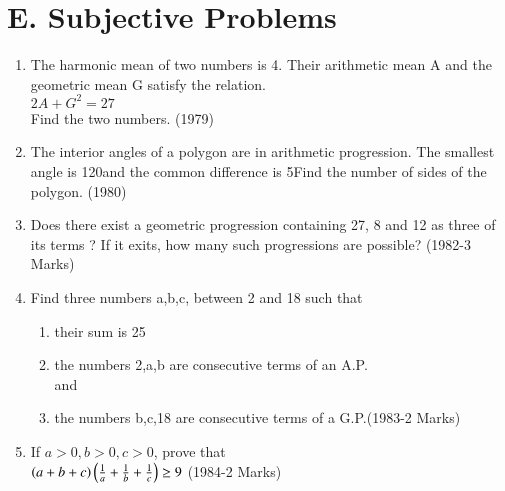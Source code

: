 \documentclass[journal,12pt,twocolumn]{IEEEtran}
\theoremstyle{remark}
\begin{document}
\section*{E. Subjective Problems}
\begin{enumerate}
    \item The harmonic mean of two numbers is 4. Their arithmetic mean A and the geometric mean G satisfy the relation.
    \\
    $2A + G^2 = 27$
    \\
    Find the two numbers.  \hfill{(1979)}

\item The interior angles of a polygon are in arithmetic progression. The smallest angle is 120\degree and the common difference is 5\degree Find the number of sides of the polygon. \hfill{(1980)}

    \item Does there exist a geometric progression containing 27, 8 and 12 as three of its terms ? If it exits, how many such progressions are possible?  \hfill{(1982-3 Marks)}

    \item Find three numbers a,b,c, between 2 and 18 such that
    \begin{enumerate}
    \item their sum is 25
    \item the numbers 2,a,b are consecutive terms of an A.P.
    \\
    and
    \item the numbers b,c,18 are consecutive terms of a G.P.\hfill{(1983-2 Marks)}
    \end{enumerate}
  

    \item If $a>0,b>0,c>0$, prove that
    \\
    $\left(a+b+c\right)\left(\frac{1}{a}+\frac{1}{b}+\frac{1}{c}\right)\geq9$
    \hfill{(1984-2 Marks)}

\end{enumerate}
\end{document}
